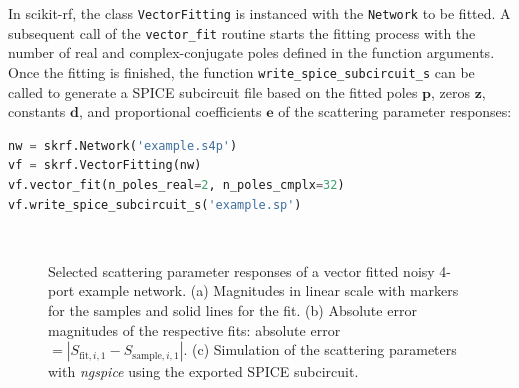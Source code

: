 \documentclass[10pt, letterpaper]{scrartcl}
\newcommand{\skrf}{{s}cikit-rf\xspace}
\begin{document}
In \skrf{}, the class \texttt{VectorFitting} is instanced with the \texttt{Network} to be fitted. A subsequent call of the \texttt{vector\_fit} routine starts the fitting process with the number of real and complex-conjugate poles defined in the function arguments. Once the fitting is finished, the function \texttt{write\_spice\_subcircuit\_s} can be called to generate a SPICE subcircuit file based on the fitted poles $\mathbf{p}$, zeros $\mathbf{z}$, constants $\mathbf{d}$, and proportional coefficients $\mathbf{e}$ of the scattering parameter responses:

\begin{lstlisting}[language=Python]
nw = skrf.Network('example.s4p')
vf = skrf.VectorFitting(nw)
vf.vector_fit(n_poles_real=2, n_poles_cmplx=32)
vf.write_spice_subcircuit_s('example.sp')
\end{lstlisting}

\begin{figure}
\centering
{}
\hfill
{}
\\
\caption{Selected scattering parameter responses of a vector fitted noisy 4-port example network. (a) Magnitudes in linear scale with markers for the samples and solid lines for the fit. (b) Absolute error magnitudes of the respective fits: absolute error $ = |S_{\mathrm{fit},i,1} - S_{\mathrm{sample},i,1}|$. (c) Simulation of the scattering parameters with \textit{ngspice} using the exported SPICE subcircuit.}
\label{figs:vectfit}
\end{figure}
\end{document}
